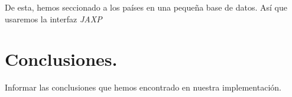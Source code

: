 \documentclass[12pt,twocolumn,draft]{article}
\begin{document}
De esta, hemos seccionado a los pa\'ises en una peque\~na base de datos. As\'i que usaremos la interfaz \textit{JAXP}\cite{JAXP}

\section{Conclusiones.}
Informar las conclusiones que hemos encontrado en nuestra implementaci\'on.\\


\newpage
	
{}
\end{document}
